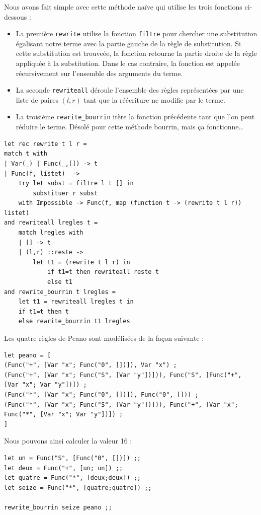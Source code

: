 \documentclass[11pt]{book}
\begin{document}
Nous avons fait simple avec cette méthode naïve qui utilise les trois fonctions ci-dessous :
\begin{itemize}
	\item La première \verb+rewrite+ utilise la fonction \verb+filtre+ pour chercher une substitution
	égalisant notre terme avec la partie gauche de la règle de substitution. Si cette substitution est trouveée, la 
	fonction retourne la partie droite de la règle appliquée à la substitution. Dans le cas contraire, la fonction
	est appelée récursivement sur l'ensemble des arguments du terme.
	\item  La seconde \verb+rewriteall+ déroule l'ensemble des règles représentées par une liste de paires $(l,r)$ tant
	que la réécriture ne modifie par le terme.
	\item La troisième \verb+rewrite_bourrin+ itère la fonction précédente tant que l'on peut réduire le terme.
	Désolé pour cette méthode bourrin, mais ça fonctionne\dots
\end{itemize}

\begin{Verbatim}
let rec rewrite t l r =
match t with
| Var(_) | Func(_,[]) -> t
| Func(f, listet)  -> 
	try let subst = filtre l t [] in
		substituer r subst 
	with Impossible -> Func(f, map (function t -> (rewrite t l r)) listet)
and rewriteall lregles t =
	match lregles with
	| [] -> t
	| (l,r) ::reste -> 
		let t1 = (rewrite t l r) in
			if t1=t then rewriteall reste t 
			else t1
and rewrite_bourrin t lregles =
	let t1 = rewriteall lregles t in
	if t1=t then t
	else rewrite_bourrin t1 lregles
\end{Verbatim}

Les quatre règles de Peano sont modélisées de la façon suivante :
\begin{Verbatim}
let peano = [
(Func("+", [Var "x"; Func("0", [])]), Var "x") ;
(Func("+", [Var "x"; Func("S", [Var "y"])])), Func("S", [Func("+", [Var "x"; Var "y"])]) ;
(Func("*", [Var "x"; Func("0", [])]), Func("0", [])) ;
(Func("*", [Var "x"; Func("S", [Var "y"])])), Func("+", [Var "x"; Func("*", [Var "x"; Var "y"])]) ;
] 
\end{Verbatim}

Nous pouvons ainsi calculer la valeur 16 :
\begin{Verbatim}
let un = Func("S", [Func("0", [])]) ;;
let deux = Func("+", [un; un]) ;;
let quatre = Func("*", [deux;deux]) ;;
let seize = Func("*", [quatre;quatre]) ;;

rewrite_bourrin seize peano ;;    
	
\end{Verbatim}
\end{document}
